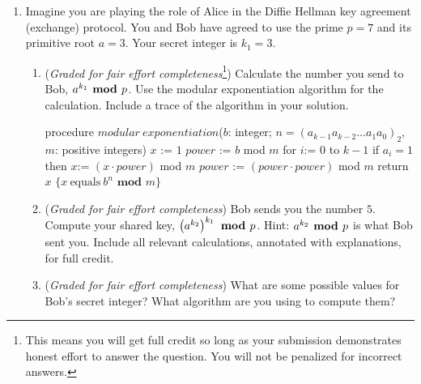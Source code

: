 \documentclass[12pt, oneside]{article}
\begin{document}
\begin{enumerate}
\begin{enumerate}
    \end{enumerate}

    \item Imagine you are playing the role of Alice in the Diffie Hellman key agreement (exchange) protocol.  
    You and Bob have agreed to use the prime $p = 7$ and its primitive root $a = 3$.
    Your secret integer is $k_1 = 3$.
        
        \begin{enumerate}
        \item  ({\it Graded for fair effort completeness}\footnote{This means 
        you will get full credit so long as your submission demonstrates honest 
        effort to answer the question. You will not be penalized for incorrect answers.}) 
        Calculate the number you send to Bob, 
        $a^{k_1} \textrm{\bf ~mod~} p$.  Use the modular exponentiation algorithm
        for the calculation. Include a trace of the algorithm in your solution.

        

\begin{algorithm}[caption={Modular Exponentation}]
    procedure $modular~exponentiation$($b$: integer; 
                 $n = (a_{k-1}a_{k-2} \ldots a_1 a_0)_2$, $m$: positive integers)
    $x$ := $1$
    $power$ := $b$ mod $m$
    for $i$:= $0$ to $k-1$
      if $a_i = 1$ then $x$:= $(x \cdot power)$ mod $m$
      $power$ := $(power \cdot power)$ mod $m$
    return $x$ $\{x~\textrm{equals}~b^n \textbf{ mod } m\} $
\end{algorithm}         
        \item  ({\it Graded for fair effort completeness}) Bob sends you the number $5$. Compute  your shared key, $\left(a^{k_2}\right)^{k_1}  
        \textrm{\bf ~mod~} p$.
        Hint: $a^{k_2} \textrm{\bf ~mod~} p$ is what Bob sent you.  Include all relevant calculations, annotated with explanations, 
        for full credit.
        
        
        \item ({\it Graded for fair effort completeness}) What are some possible values for Bob's secret integer?  What 
        algorithm are you using to compute them?
        \end{enumerate}
    

\end{enumerate}
\end{document}
